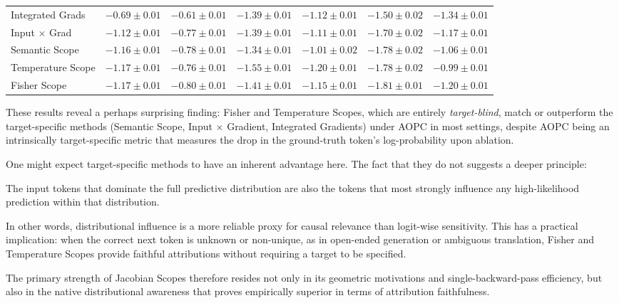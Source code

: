 \documentclass{article}
\begin{document}
\begin{table}[h]
{\begin{tabular}{lcccccc}
  Integrated Grads    & $-0.69 \pm 0.01$ & $-0.61 \pm 0.01$ & $-1.39 \pm 0.01$ & $-1.12 \pm 0.01$ & $-1.50 \pm 0.02$ & $\mathbf{-1.34 \pm 0.01}$ \\
  Input $\times$ Grad & $-1.12 \pm 0.01$ & $-0.77 \pm 0.01$ & $-1.39 \pm 0.01$ & $-1.11 \pm 0.01$ & $-1.70 \pm 0.02$ & $-1.17 \pm 0.01$ \\
  \hline
  Semantic Scope      & $-1.16 \pm 0.01$ & $-0.78 \pm 0.01$ & $-1.34 \pm 0.01$ & $-1.01 \pm 0.02$ & $-1.78 \pm 0.02$ & $-1.06 \pm 0.01$ \\
  Temperature Scope   & $\mathbf{-1.17 \pm 0.01}$ & $-0.76 \pm 0.01$ & $\mathbf{-1.55 \pm 0.01}$ & $\mathbf{-1.20 \pm 0.01}$ & $-1.78 \pm 0.02$ & $-0.99 \pm 0.01$ \\
  Fisher Scope        & $\mathbf{-1.17 \pm 0.01}$ & $\mathbf{-0.80 \pm 0.01}$ & $-1.41 \pm 0.01$ & $-1.15 \pm 0.01$ & $\mathbf{-1.81 \pm 0.01}$ & $-1.20 \pm 0.01$ \\
  \hline  
  \end{tabular}}
  \label{tab:aupc}
\end{table}

These results reveal a perhaps surprising finding: Fisher and Temperature Scopes, which are entirely \emph{target-blind}, match or outperform the target-specific methods (Semantic Scope, Input $\times$ Gradient, Integrated Gradients) under AOPC in most settings, despite AOPC being an intrinsically target-specific metric that measures the drop in the ground-truth token's log-probability upon ablation.

One might expect target-specific methods to have an inherent advantage here.
The fact that they do not suggests a deeper principle: 
\begin{tcolorbox}[colback=gray!10, colframe=gray!50]
The input tokens that dominate the full predictive distribution are also the tokens that most strongly influence any high-likelihood prediction within that distribution.
\end{tcolorbox}
In other words, distributional influence is a more reliable proxy for causal relevance than logit-wise sensitivity.
This has a practical implication: when the correct next token is unknown or non-unique, as in open-ended generation or ambiguous translation, Fisher and Temperature Scopes provide faithful attributions without requiring a target to be specified.

The primary strength of Jacobian Scopes therefore resides not only in its geometric motivations and single-backward-pass efficiency, but also in the native distributional awareness that proves empirically superior in terms of attribution faithfulness.
\end{document}
